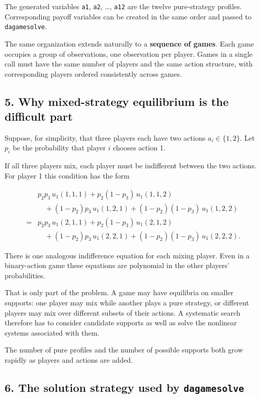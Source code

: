 \documentclass[11pt]{article}
\begin{document}
    The generated variables \texttt{a1}, \texttt{a2}, \ldots, \texttt{a12}
are the twelve pure-strategy profiles. Corresponding payoff variables
can be created in the same order and passed to \texttt{dagamesolve}.

The same organization extends naturally to a \textbf{sequence of games}.
Each game occupies a group of observations, one observation per player.
Games in a single call must have the same number of players and the same
action structure, with corresponding players ordered consistently across
games.

    \hypertarget{why-mixed-strategy-equilibrium-is-the-difficult-part}{%
\subsection{5. Why mixed-strategy equilibrium is the difficult
part}\label{why-mixed-strategy-equilibrium-is-the-difficult-part}}

Suppose, for simplicity, that three players each have two actions
\(a_i \in \{1,2\}\). Let \(p_i\) be the probability that player \(i\)
chooses action 1.

If all three players mix, each player must be indifferent between the
two actions. For player 1 this condition has the form

\[
\begin{aligned}
& p_2p_3\,u_1(1,1,1)
+p_2(1-p_3)\,u_1(1,1,2) \\
&\quad +(1-p_2)p_3\,u_1(1,2,1)
+(1-p_2)(1-p_3)\,u_1(1,2,2) \\
={}&
p_2p_3\,u_1(2,1,1)
+p_2(1-p_3)\,u_1(2,1,2) \\
&\quad +(1-p_2)p_3\,u_1(2,2,1)
+(1-p_2)(1-p_3)\,u_1(2,2,2).
\end{aligned}
\]

There is one analogous indifference equation for each mixing player.
Even in a binary-action game these equations are polynomial in the other
players' probabilities.

That is only part of the problem. A game may have equilibria on smaller
supports: one player may mix while another plays a pure strategy, or
different players may mix over different subsets of their actions. A
systematic search therefore has to consider candidate supports as well
as solve the nonlinear systems associated with them.

The number of pure profiles and the number of possible supports both
grow rapidly as players and actions are added.

    \hypertarget{the-solution-strategy-used-by-dagamesolve}{%
\subsection{\texorpdfstring{6. The solution strategy used by
\texttt{dagamesolve}}{6. The solution strategy used by dagamesolve}}\label{the-solution-strategy-used-by-dagamesolve}}
\end{document}
